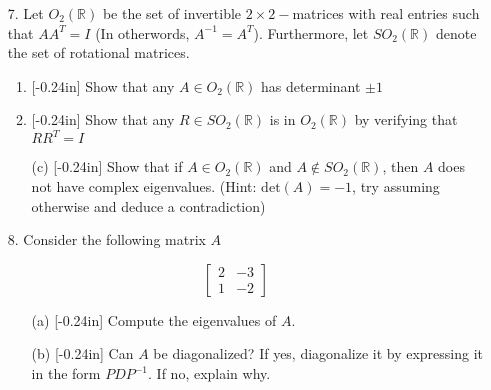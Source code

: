 \documentclass[letterpaper,12pt]{article}
\theoremstyle{definition}
\begin{document}
\newpage
\begin{enumerate}
    \item[7.] Let $O_2(\mathbb{R})$ be the set of invertible $2\times2-$matrices with real entries such that $AA^T = I$ (In otherwords, $A^{-1} = A^T$). Furthermore, let $SO_2(\mathbb{R})$ denote the set of rotational matrices.
    \begin{enumerate}
        \item\reversemarginpar{}[-0.24in] Show that any $A \in O_2(\mathbb{R})$ has determinant $\pm 1$
        \vspace{1.5in}
        \item\reversemarginpar{}[-0.24in] Show that any $R \in SO_2(\mathbb{R})$ is in $O_2(\mathbb{R})$ by verifying that $RR^T = I$
    \end{enumerate}
\end{enumerate}
\newpage
\begin{enumerate}
    \item[] \begin{enumerate}
        \item[(c)]\reversemarginpar{}[-0.24in] Show that if $A \in O_2(\mathbb{R})$ and $A \notin SO_2(\mathbb{R})$, then $A$ does not have complex eigenvalues. (Hint: $\mathrm{det}(A) = -1$, try assuming otherwise and deduce a contradiction)
    \end{enumerate}
\end{enumerate}
\newpage
\begin{enumerate}
    \item[8.] Consider the following matrix $A$
\end{enumerate}
$$\begin{bmatrix}
    2 & -3 \\ 1 & -2 
\end{bmatrix}$$
\begin{enumerate}
    \item[] \begin{enumerate}
        \item[(a)]\reversemarginpar{}[-0.24in] Compute the eigenvalues of $A$.
    \end{enumerate}
\end{enumerate}
\newpage
\begin{enumerate}
    \item[] \begin{enumerate}
        \item[(b)]\reversemarginpar{}[-0.24in] Can $A$ be diagonalized? If yes, diagonalize it by expressing it in the form $PDP^{-1}$. If no, explain why.
    \end{enumerate}
\end{enumerate}
\end{document}
